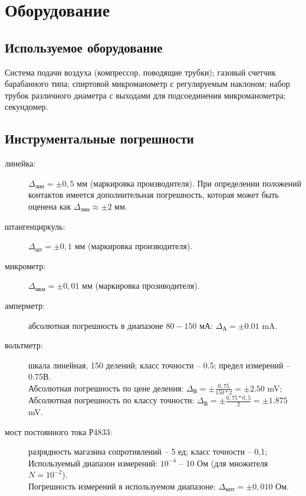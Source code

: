 \documentclass[a4paper]{article}
\begin{document}
\section{Оборудование}
\subsection{Используемое оборудование}
Система подачи воздуха (компрессор, поводящие трубки); газовый счетчик барабанного типа; спиртовой микроманометр с регулируемым наклоном; набор трубок различного диаметра с выходами для подсоединения микроманометра; секундомер.
\subsection{Инструментальные погрешности}
\vspace{0.15 cm}

\begin{description}
    \item[линейка:] $\Delta_\text{лин}=\pm0,5$ мм (маркировка производителя). 
    При определении положений контактов имеется дополнительная погрешность, которая может быть оценена как $\Delta_\text{лин} \approx \pm 2$ мм.
    \item[штангенциркуль:] $\Delta_\text{шт}=\pm0,1$ мм (маркировка производителя).
    \item[микрометр:] $\Delta_\text{мкм}=\pm0,01$ мм (маркировка прозиводителя).
    \item[амперметр:] абсолютная погрешность в диапазоне $80-150$ мА: $\Delta_\text{А} = \pm 0.01$ mA.

    \item[вольтметр:] шкала линейная, 150 делений; класс точности -- 0.5; предел измерений -- 0.75В. 
    \\ Абсолютная погрешность по цене деления: $\Delta_\text{В} = \pm \frac{0,75}{150*2} = \pm 2.50$ mV;
    \\ Абсолютная погрешность по классу точности: $\Delta_\text{В} =\pm \frac{0,75*0,5}{2} = \pm 1.875$ mV.

    \item[мост постоянного тока Р4833:] разрядность магазина сопротивлений -- 5 ед; класс точности -- 0,1; 
    \\ Используемый диапазон измерений: $10^{-4}$ – 10 Ом (для множителя $N = 10^{-2}$). \\
    Погрешность измерений в используемом диапазоне: $\Delta_\text{мпт} =\pm0,010$ Ом.
\end{description}
\end{document}
